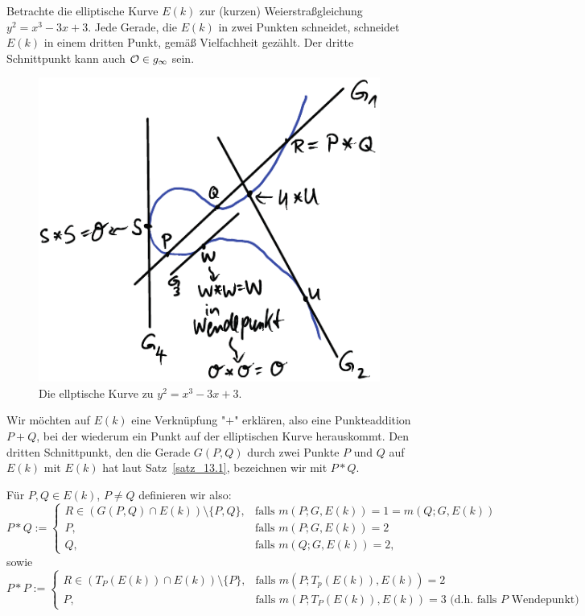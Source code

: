 \begin{bsp}
	Betrachte die elliptische Kurve $E(k)$ zur (kurzen) Weierstraßgleichung $y^2 = x^3 - 3x + 3$. Jede Gerade, die $E(k)$ in zwei Punkten schneidet, schneidet $E(k)$ in einem dritten Punkt, gemäß Vielfachheit gezählt. Der dritte Schnittpunkt kann auch $\mathcal{O} \in g_\infty$ sein. 
	\newpage
	\begin{figure}[h]
		\centering
		\includegraphics[scale=1]{img/bsp_13_3.pdf}
		\caption{Die ellptische Kurve zu $y^2 = x^3 - 3x + 3$.}
	\end{figure}
\end{bsp}

Wir möchten auf $E(k)$ eine Verknüpfung "$+$" erklären, also eine Punkteaddition $P + Q$, bei der wiederum ein Punkt auf der elliptischen Kurve herauskommt. Den dritten Schnittpunkt, den die Gerade $G(P,Q)$ durch zwei Punkte $P$ und $Q$ auf $E(k)$ mit $E(k)$ hat laut Satz~\ref{satz_13.1}, bezeichnen wir mit $P * Q$.

\begin{defn}
	Für $P,Q \in E(k)$, $P \neq Q$ definieren wir also:
	\[ P * Q := \begin{cases}
		R \in (G(P,Q) \cap E(k)) \setminus \{P,Q\}, & \text{falls } m(P;G,E(k)) = 1 = m(Q;G,E(k)) \\
		P, & \text{falls } m(P;G,E(k)) = 2 \\
		Q, & \text{falls } m(Q;G,E(k)) = 2,
	\end{cases} \]
	sowie
	\[ P * P := \begin{cases}
		R \in (T_P(E(k)) \cap E(k)) \setminus \{P\}, & \text{falls } m(P;T_p(E(k)),E(k)) = 2 \\
		P, & \text{falls } m(P;T_P(E(k)),E(k)) = 3 \text{ (d.h. falls } P \text{ Wendepunkt)}
	\end{cases} \]
\end{defn}

